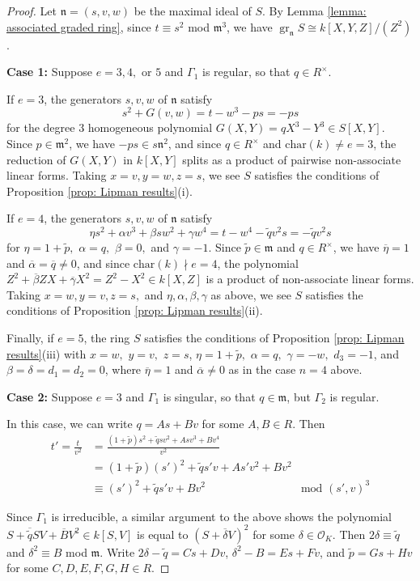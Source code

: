 \documentclass[12pt]{amsart}
\numberwithin{equation}{section}
\theoremstyle{definition}
\newcommand{\n}{\mathfrak{n}}
\renewcommand{\O}{\mathcal{O}}
\renewcommand{\c}[1]{\overline{#1}}
\newcommand{\m}{\mathfrak{m}}
\newcommand{\tx}[1]{\text{#1}}
\DeclareMathOperator{\gr}{gr}
\begin{document}
\begin{proof}
    Let $\n=(s,v,w)$ be the maximal ideal of $S$. By Lemma \ref{lemma: associated graded ring}, since $t\equiv s^2$ mod $\m^3$, we have $\gr_\n S\cong k[X,Y,Z]/(Z^2)$. 
    
    \textbf{Case 1:} Suppose $e=3,4,$ or $5$ and $\Gamma_1$ is regular, so that $q\in R^\times$.
    
    If $e=3$, the generators $s,v,w$ of $\n$ satisfy
    \[s^2+G(v,w)=t-w^3-ps=-ps\] for the degree $3$ homogeneous polynomial $G(X,Y)=qX^3-Y^3\in S[X,Y]$. Since $p\in\m^2$, we have $-ps\in s\n^2$, and since $q\in R^\times$ and $\tx{char}(k)\neq e=3$, the reduction of $G(X,Y)$ in $k[X,Y]$ splits as a product of pairwise non-associate linear forms. Taking $x=v,y=w,z=s$, we see $S$ satisfies the conditions of Proposition \ref{prop: Lipman results}(i).

    If $e=4$, the generators $s,v,w$ of $\n$ satisfy \[\eta s^2+\alpha v^3+\beta sw^2+\gamma w^4=t-w^4-\tilde{q}v^2s=-\tilde{q}v^2s\]
    for $\eta=1+\tilde{p},$ $\alpha=q,$ $\beta=0,$ and $\gamma=-1$. Since $\tilde{p}\in\m$ and $q\in R^\times$, we have $\c{\eta}=1$ and $\c{\alpha}=\c{q}\neq0$, and since $\tx{char}(k)\nmid e=4$, the polynomial $Z^2+\c{\beta} ZX+\c{\gamma} X^2=Z^2-X^2\in k[X,Z]$ is a product of non-associate linear forms. Taking $x=w,y=v,z=s,$ and $\eta,\alpha,\beta,\gamma$ as above, we see $S$ satisfies the conditions of Proposition \ref{prop: Lipman results}(ii).

    Finally, if $e=5$, the ring $S$ satisfies the conditions of Proposition \ref{prop: Lipman results}(iii) with $x=w,$ $y=v,$ $z=s$, $\eta=1+\tilde{p},$ $\alpha=q,$ $\gamma=-w,$ $d_3=-1$, and $\beta=\delta=d_1=d_2=0$, where $\c{\eta}=1$ and $\c{\alpha}\neq0$ as in the case $n=4$ above. 

    \textbf{Case 2:} Suppose $e=3$ and $\Gamma_1$ is singular, so that $q\in\m$, but $\Gamma_2$ is regular.

    In this case, we can write $q=As+Bv$ for some $A,B\in R$. Then
    \begin{align*}
    t'=\frac{t}{v^2}&=\frac{(1+\tilde{p})s^2+\tilde{q}sv^2+Asv^3+Bv^4}{v^2}&\\
    &=(1+\tilde{p})(s')^2+\tilde{q}s'v+As'v^2+Bv^2&\\
    &\equiv(s')^2+\tilde{q}s'v+Bv^2 &\tx{mod }(s',v)^3
    \end{align*}

    Since $\Gamma_1$ is irreducible, a similar argument to the above shows the polynomial $S+\c{\tilde{q}}SV+\c{B}V^2\in k[S,V]$ is equal to $(S+\c{\delta} V)^2$ for some $\delta\in\O_K$. Then $2\delta\equiv\tilde{q}$ and $\delta^2\equiv B$ mod $\m$. Write $2\delta-\tilde{q}=Cs+Dv$, $\delta^2-B=Es+Fv$, and $\tilde{p}=Gs+Hv$ for some $C,D,E,F,G,H\in R$. 


\end{proof}
\end{document}
